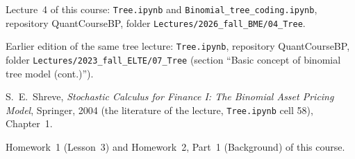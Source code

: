 \documentclass[11pt,a4paper]{article}
\newcommand{\subhead}[1]{\par\medskip\noindent{\large\bfseries #1}\par\smallskip\noindent\ignorespaces}
\begin{document}
\subhead{References.}
\begin{enumerate}[label={[\arabic*]}]
\item Lecture~4 of this course: \texttt{Tree.ipynb} and \texttt{Binomial\_tree\_coding.ipynb}, repository QuantCourseBP, folder \texttt{Lectures/2026\_fall\_BME/04\_Tree}.
\item Earlier edition of the same tree lecture: \texttt{Tree.ipynb}, repository QuantCourseBP, folder \texttt{Lectures/2023\_fall\_ELTE/07\_Tree} (section ``Basic concept of binomial tree model (cont.)'').
\item S.~E.~Shreve, \emph{Stochastic Calculus for Finance I: The Binomial Asset Pricing Model}, Springer, 2004 (the literature of the lecture, \texttt{Tree.ipynb} cell 58), Chapter~1.
\item Homework~1 (Lesson~3) and Homework~2, Part~1 (Background) of this course.
\end{enumerate}
\end{document}
